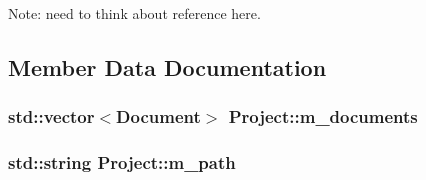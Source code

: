 Note: need to think about reference here. 



\subsection{Member Data Documentation}
\subsubsection[{\texorpdfstring{m\_documents}{m_documents}}]{\setlength{\rightskip}{0pt plus 5cm}std::vector$<${\bf Document}$>$ Project::m\_documents\hspace{0.3cm}{\ttfamily [private]}}\hypertarget{class_project_a9f27e95fa3e22adbdfd6b2789fb9dcf2}{}\label{class_project_a9f27e95fa3e22adbdfd6b2789fb9dcf2}
\subsubsection[{\texorpdfstring{m\_path}{m_path}}]{\setlength{\rightskip}{0pt plus 5cm}std::string Project::m\_path\hspace{0.3cm}{\ttfamily [private]}}\hypertarget{class_project_a6c6b9942014ec60bdc35bfd29d7b21fa}{}\label{class_project_a6c6b9942014ec60bdc35bfd29d7b21fa}
